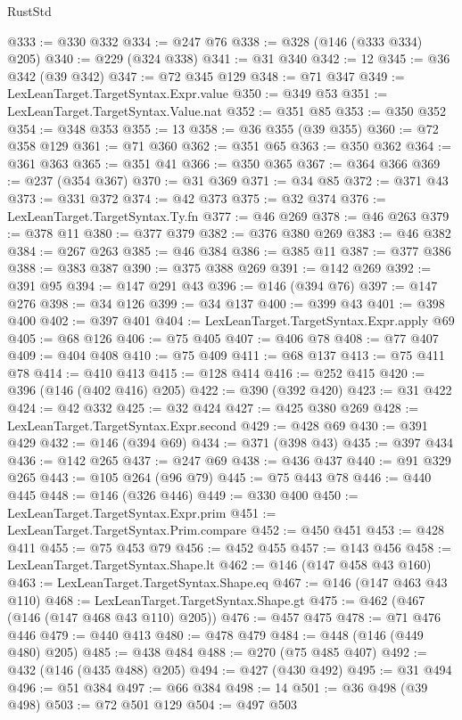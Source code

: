 \begin{lexlean}{RustStd}
\begin{coremodule}
{\begin{coremodule}
{{{{{{{{{{{{{{{{{{{{{{{{{{@333 := @330 @332
@334 := @247 @76
@338 := @328 (@146 (@333 @334) @205)
@340 := @229 (@324 @338)
@341 := @31 @340
@342 := 12
@345 := @36 @342 (@39 @342)
@347 := @72 @345 @129
@348 := @71 @347
@349 := LexLeanTarget.TargetSyntax.Expr.value
@350 := @349 @53
@351 := LexLeanTarget.TargetSyntax.Value.nat
@352 := @351 @85
@353 := @350 @352
@354 := @348 @353
@355 := 13
@358 := @36 @355 (@39 @355)
@360 := @72 @358 @129
@361 := @71 @360
@362 := @351 @65
@363 := @350 @362
@364 := @361 @363
@365 := @351 @41
@366 := @350 @365
@367 := @364 @366
@369 := @237 (@354 @367)
@370 := @31 @369
@371 := @34 @85
@372 := @371 @43
@373 := @331 @372
@374 := @42 @373
@375 := @32 @374
@376 := LexLeanTarget.TargetSyntax.Ty.fn
@377 := @46 @269
@378 := @46 @263
@379 := @378 @11
@380 := @377 @379
@382 := @376 @380 @269
@383 := @46 @382
@384 := @267 @263
@385 := @46 @384
@386 := @385 @11
@387 := @377 @386
@388 := @383 @387
@390 := @375 @388 @269
@391 := @142 @269
@392 := @391 @95
@394 := @147 @291 @43
@396 := @146 (@394 @76)
@397 := @147 @276
@398 := @34 @126
@399 := @34 @137
@400 := @399 @43
@401 := @398 @400
@402 := @397 @401
@404 := LexLeanTarget.TargetSyntax.Expr.apply @69
@405 := @68 @126
@406 := @75 @405
@407 := @406 @78
@408 := @77 @407
@409 := @404 @408
@410 := @75 @409
@411 := @68 @137
@413 := @75 @411 @78
@414 := @410 @413
@415 := @128 @414
@416 := @252 @415
@420 := @396 (@146 (@402 @416) @205)
@422 := @390 (@392 @420)
@423 := @31 @422
@424 := @42 @332
@425 := @32 @424
@427 := @425 @380 @269
@428 := LexLeanTarget.TargetSyntax.Expr.second
@429 := @428 @69
@430 := @391 @429
@432 := @146 (@394 @69)
@434 := @371 (@398 @43)
@435 := @397 @434
@436 := @142 @265
@437 := @247 @69
@438 := @436 @437
@440 := @91 @329 @265
@443 := @105 @264 (@96 @79)
@445 := @75 @443 @78
@446 := @440 @445
@448 := @146 (@326 @446)
@449 := @330 @400
@450 := LexLeanTarget.TargetSyntax.Expr.prim
@451 := LexLeanTarget.TargetSyntax.Prim.compare
@452 := @450 @451
@453 := @428 @411
@455 := @75 @453 @79
@456 := @452 @455
@457 := @143 @456
@458 := LexLeanTarget.TargetSyntax.Shape.lt
@462 := @146 (@147 @458 @43 @160)
@463 := LexLeanTarget.TargetSyntax.Shape.eq
@467 := @146 (@147 @463 @43 @110)
@468 := LexLeanTarget.TargetSyntax.Shape.gt
@475 := @462 (@467 (@146 (@147 @468 @43 @110) @205))
@476 := @457 @475
@478 := @71 @476 @446
@479 := @440 @413
@480 := @478 @479
@484 := @448 (@146 (@449 @480) @205)
@485 := @438 @484
@488 := @270 (@75 @485 @407)
@492 := @432 (@146 (@435 @488) @205)
@494 := @427 (@430 @492)
@495 := @31 @494
@496 := @51 @384
@497 := @66 @384
@498 := 14
@501 := @36 @498 (@39 @498)
@503 := @72 @501 @129
@504 := @497 @503
}}}}}}}}}}}}}}}}}}}}}}}}}}
\end{coremodule}}
\end{coremodule}
\end{lexlean}
